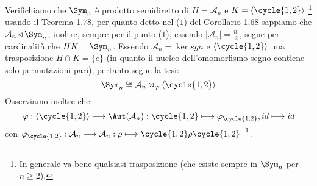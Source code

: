 \documentclass[11pt]{scrartcl}
\begin{document}
\begin{example}
    Verifichiamo che $\Sym_n$ è prodotto semidiretto di $H = \mathcal{A}_n$ e $ K = \left<\cycle{1,2}\right>$ \footnote{In generale va bene qualsiasi trasposizione (che esiste sempre in $\Sym_n$ per $n \geq 2$).}
    usando il \hyperref[t:1.78]{Teorema 1.78}, per quanto detto nel ($1$) del \hyperref[c:1.68]{Corollario 1.68} sappiamo che $\mathcal{A}_n \triangleleft \Sym_n$, inoltre, sempre per il punto ($1$), essendo $|\mathcal{A}_n| = \frac{n!}{2}$, segue
    per cardinalità che $HK = \Sym_n$. Essendo $\mathcal{A}_n = \ker sgn$ e $\left<\cycle{1,2}\right>$ una trasposizione $H \cap K = \{e\}$ (in quanto il nucleo dell'omomorfismo segno contiene solo permutazioni pari), pertanto segue la tesi:
        \[ \Sym_n \cong \mathcal{A}_n \rtimes_{\varphi} \left<\cycle{1,2}\right>
            \]
    Osserviamo inoltre che:
        \[ \varphi : \left<\cycle{1,2}\right> \longrightarrow \Aut(\mathcal{A}_n) : \cycle{1,2} \longmapsto \varphi_{\cycle{1,2}}, id \longmapsto id
            \]
    con $\varphi_{\cycle{1,2}} : \mathcal{A}_n \longrightarrow \mathcal{A}_n : \rho \longmapsto \cycle{1,2}\rho\cycle{1,2}^{-1}$.
\end{example}
\end{document}
